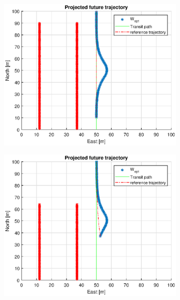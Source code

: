 \begin{figure}[!b]%
    \centering 
    \begin{subfigure}[b]{0.61\textwidth}
        \centering
        \includegraphics[width=\textwidth]{Images/Figures/Enkel_HO/Simple0_f999_Frame1}
    \end{subfigure}
    \hfill 
    \begin{subfigure}[b]{0.61\textwidth}
        \centering
        \includegraphics[width=\textwidth]{Images/Figures/Enkel_HO/Simple0_f999_Frame2}

\end{subfigure}
\end{figure}
